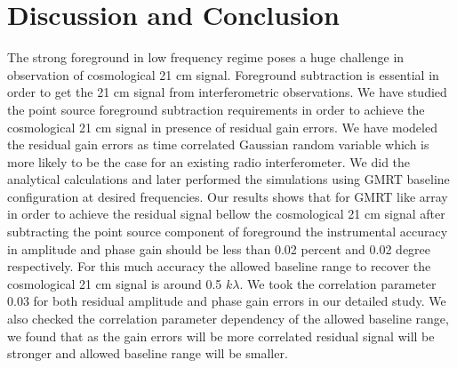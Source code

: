 \documentclass[fleqn,usenatbib]{mnras}
\begin{document}
\section{Discussion and Conclusion}
The strong foreground in low frequency regime poses a huge challenge in observation of cosmological 21 cm signal. Foreground subtraction is essential in order to get the 21 cm signal from interferometric observations.
We have studied the point source foreground subtraction requirements in order to achieve the cosmological 21 cm signal in presence of residual gain errors. We have modeled the residual gain errors as time correlated Gaussian random variable which is more likely to be the case for an existing radio interferometer. We did the analytical calculations and later performed the simulations using GMRT baseline configuration at desired frequencies. Our results shows that for GMRT like array in order to achieve the residual signal bellow the cosmological 21 cm signal after subtracting the point source component of foreground the instrumental accuracy in amplitude and phase gain should be less than 0.02 percent and 0.02 degree respectively. For this much accuracy the allowed baseline range to recover the cosmological 21 cm signal is around 0.5 $k\lambda$. We took the correlation parameter 0.03 for both residual amplitude and phase gain errors in our detailed study. We also checked the correlation parameter dependency of the allowed baseline range, we found that as the gain errors will be more correlated residual signal will be stronger and allowed baseline range will be smaller. 
\end{document}
